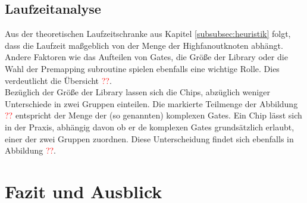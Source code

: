 \documentclass[11pt, a4paper, german]{article}
\begin{document}
 \subsection{Laufzeitanalyse}
 \label{subsec:laufzeitanalyse}
Aus der theoretischen Laufzeitschranke aus Kapitel \ref{subsubsec:heuristik} folgt, dass die Laufzeit maßgeblich von der Menge der Highfanoutknoten abhängt. Andere Faktoren wie das Aufteilen von Gates, die Größe der Library oder die Wahl der Premapping subroutine spielen ebenfalls eine wichtige Rolle. Dies verdeutlicht die Übersicht \textcolor{red}{??}.\\
 Bezüglich der Größe der Library lassen sich die Chips, abzüglich weniger Unterschiede in zwei Gruppen einteilen. Die markierte Teilmenge der Abbildung \textcolor{red}{??} entspricht der Menge der (so genannten) komplexen Gates. Ein Chip lässt sich in der Praxis, abhängig davon ob er de komplexen Gates grundsätzlich erlaubt, einer der zwei Gruppen zuordnen. Diese Unterscheidung findet sich ebenfalls in Abbildung \textcolor{red}{??}.


\section{Fazit und Ausblick}
\label{sec:fazit_und_ausblick}
	







\newpage
\end{document}
